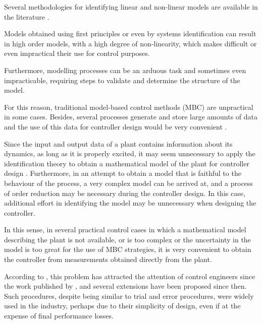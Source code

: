 Several methodologies for identifying linear and non-linear models are available in the literature \citep{aguirre2015, ljung1999}.

Models obtained using first principles or even by systems identification can result in high order models, with a high degree of non-linearity, which makes difficult or even impractical their use for control purposes.



Furthermore, modelling processes can be an arduous task and sometimes even impracticable, requiring steps to validate and determine the structure of the model. 

For this reason, traditional model-based control methods (MBC) are unpractical in some cases. Besides, several processes generate and store large amounts of data and the use of this data for controller design would be very convenient \citep{hou2013}.

Since the input and output data of a plant contains information about its dynamics, as long as it is properly excited, it may seem unnecessary to apply the identification theory to obtain a mathematical model of the plant for controller design \citep{ikeda2001}.
Furthermore, in an attempt to obtain a model that is faithful to the behaviour of the process, a very complex model can be arrived at, and a process of order reduction may be necessary during the controller design. In this case, additional effort in identifying the model may be unnecessary when designing the controller.

In this sense, in several practical control cases in which a mathematical model describing the plant is not available, or is too complex or the uncertainty in the model is too great for the use of MBC strategies, it is very convenient to obtain the controller from measurements obtained directly from the plant.

According to \cite{campi2002}, this problem has attracted the attention of control engineers since the work published by \cite{ziegler1942}, and several extensions have been proposed since then.
Such procedures, despite being similar to trial and error procedures, were widely used in the industry, perhaps due to their simplicity of design, even if at the expense of final performance losses.

